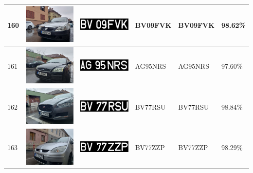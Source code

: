 \documentclass[a4paper,12pt]{report}
\begin{document}
\begin{longtable}{| m{0.6cm} | m{3cm} | m{3cm} | m{1.8cm} | m{1.8cm} | m{1.8cm} |}
    160 & \includegraphics[width=3cm,keepaspectratio]{dataset/97_d1.jpg}  & \includegraphics[width=3cm,keepaspectratio]{segmentari/160.jpg} & BV09FVK             & BV09FVK              & 98.62\%    \\ \hline
    161 & \includegraphics[width=3cm,keepaspectratio]{dataset/98_d1.jpg}  & \includegraphics[width=3cm,keepaspectratio]{segmentari/161.jpg} & AG95NRS             & AG95NRS              & 97.60\%    \\ \hline
    162 & \includegraphics[width=3cm,keepaspectratio]{dataset/99_d1.jpg}  & \includegraphics[width=3cm,keepaspectratio]{segmentari/162.jpg} & BV77RSU             & BV77RSU              & 98.84\%    \\ \hline
    163 & \includegraphics[width=3cm,keepaspectratio]{dataset/100_d1.jpg} & \includegraphics[width=3cm,keepaspectratio]{segmentari/163.jpg} & BV77ZZP             & BV77ZZP              & 98.29\%    \\ \hline

\end{longtable}
\end{document}
